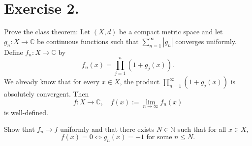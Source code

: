 
\section{Exercise 2.}

Prove the class theorem:  
Let \((X, d)\) be a compact metric space and let \(g_n : X \to \mathbb{C}\) be continuous functions such that \(\sum_{n=1}^{\infty} |g_n|\) converges uniformly. Define \(f_n : X \to \mathbb{C}\) by
\[
f_n(x) = \prod_{j=1}^{n} (1 + g_j(x)).
\]
We already know that for every \(x \in X\), the product \(\prod_{n=1}^{\infty} (1 + g_j(x))\) is absolutely convergent. Then
\[
f : X \to \mathbb{C}, \quad f(x) := \lim_{n \to \infty} f_n(x)
\]
is well-defined.

Show that \(f_n \to f\) uniformly and that there exists \(N \in \mathbb{N}\) such that for all \(x \in X\),
\[
f(x) = 0 \iff g_n(x) = -1 \text{ for some } n \leq N.
\]
